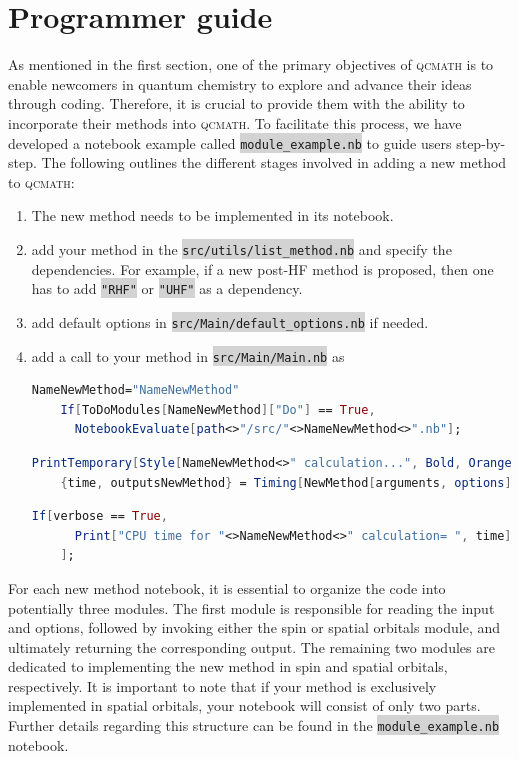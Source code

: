 \documentclass[aip,jcp,reprint,noshowkeys,superscriptaddress]{revtex4-1}
\newcommand{\qcmath}{\textsc{qcmath}\xspace}
\newcommand{\keyword}[1]{{\colorbox{lightgray}{\texttt{#1}}}}
\begin{document}
\section{Programmer guide}
As mentioned in the first section, one of the primary objectives of \qcmath is to enable newcomers in quantum chemistry to explore and advance their ideas through coding. Therefore, it is crucial to provide them with the ability to incorporate their methods into \qcmath. To facilitate this process, we have developed a notebook example called \keyword{module\_example.nb} to guide users step-by-step. The following outlines the different stages involved in adding a new method to \qcmath:
\begin{enumerate}
	\item The new method needs to be implemented in its notebook.
	\item add your method in the \keyword{src/utils/list\_method.nb} and specify the dependencies. For example, if a new post-HF method is proposed, then one has to add \keyword{"RHF"} or \keyword{"UHF"} as a dependency.
	\item add default options in \keyword{src/Main/default\_options.nb} if needed.
	\item add a call to your method in \keyword{src/Main/Main.nb} as
    \begin{lstlisting}[extendedchars=true,language=Mathematica]
    NameNewMethod="NameNewMethod"
    If[ToDoModules[NameNewMethod]["Do"] == True,
      NotebookEvaluate[path<>"/src/"<>NameNewMethod<>".nb"];
    \end{lstlisting}
    \begin{lstlisting}[extendedchars=true,language=Mathematica]
    PrintTemporary[Style[NameNewMethod<>" calculation...", Bold, Orange]];
    {time, outputsNewMethod} = Timing[NewMethod[arguments, options]];	
    \end{lstlisting}
    \begin{lstlisting}[extendedchars=true,language=Mathematica]
    If[verbose == True, 
      Print["CPU time for "<>NameNewMethod<>" calculation= ", time]];
    ];
    \end{lstlisting}
\end{enumerate}
For each new method notebook, it is essential to organize the code into potentially three modules. The first module is responsible for reading the input and options, followed by invoking either the spin or spatial orbitals module, and ultimately returning the corresponding output. The remaining two modules are dedicated to implementing the new method in spin and spatial orbitals, respectively. It is important to note that if your method is exclusively implemented in spatial orbitals, your notebook will consist of only two parts. Further details regarding this structure can be found in the \keyword{module\_example.nb} notebook.


\end{document}
